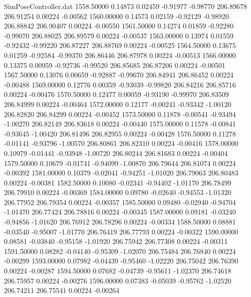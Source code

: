\begin{filecontents}{SimPoseController.dat}
1558.50000    0.14873    0.02459    -0.91977   -0.98770  206.89678  206.91254    0.00224   -0.00562
1560.00000    0.14573    0.02159    -0.92129   -0.98920  206.88842  206.90407    0.00224   -0.00550
1561.50000    0.14274    0.01859    -0.92280   -0.99070  206.88025  206.89579    0.00224   -0.00537
1563.00000    0.13974    0.01559    -0.92432   -0.99220  206.87227  206.88769    0.00224   -0.00525
1564.50000    0.13675    0.01259    -0.92584   -0.99370  206.86446  206.87978    0.00224   -0.00513
1566.00000    0.13375    0.00959    -0.92736   -0.99520  206.85685  206.87206    0.00224   -0.00501
1567.50000    0.13076    0.00659    -0.92887   -0.99670  206.84941  206.86452    0.00224   -0.00488
1569.00000    0.12776    0.00359    -0.93039   -0.99820  206.84216  206.85716    0.00224   -0.00476
1570.50000    0.12477    0.00059    -0.93190   -0.99970  206.83509  206.84999    0.00224   -0.00464
1572.00000    0.12177   -0.00241    -0.93342   -1.00120  206.82820  206.84299    0.00224   -0.00452
1573.50000    0.11878   -0.00541    -0.93494   -1.00270  206.82149  206.83618    0.00224   -0.00440
1575.00000    0.11578   -0.00841    -0.93645   -1.00420  206.81496  206.82955    0.00224   -0.00428
1576.50000    0.11278   -0.01141    -0.93796   -1.00570  206.80861  206.82310    0.00224   -0.00416
1578.00000    0.10979   -0.01441    -0.93948   -1.00720  206.80244  206.81683    0.00224   -0.00404
1579.50000    0.10679   -0.01741    -0.94099   -1.00870  206.79644  206.81074    0.00224   -0.00392
1581.00000    0.10379   -0.02041    -0.94251   -1.01020  206.79063  206.80483    0.00224   -0.00381
1582.50000    0.10080   -0.02341    -0.94402   -1.01170  206.78499  206.79910    0.00224   -0.00369
1584.00000    0.09780   -0.02640    -0.94553   -1.01320  206.77952  206.79354    0.00224   -0.00357
1585.50000    0.09480   -0.02940    -0.94704   -1.01470  206.77424  206.78816    0.00224   -0.00345
1587.00000    0.09181   -0.03240    -0.94856   -1.01620  206.76912  206.78296    0.00224   -0.00334
1588.50000    0.08881   -0.03540    -0.95007   -1.01770  206.76419  206.77793    0.00224   -0.00322
1590.00000    0.08581   -0.03840    -0.95158   -1.01920  206.75942  206.77308    0.00224   -0.00311
1591.50000    0.08282   -0.04140    -0.95309   -1.02070  206.75484  206.76840    0.00224   -0.00299
1593.00000    0.07982   -0.04439    -0.95460   -1.02220  206.75042  206.76390    0.00224   -0.00287
1594.50000    0.07682   -0.04739    -0.95611   -1.02370  206.74618  206.75957    0.00224   -0.00276
1596.00000    0.07383   -0.05039    -0.95762   -1.02520  206.74211  206.75541    0.00224   -0.00264

\end{filecontents}

